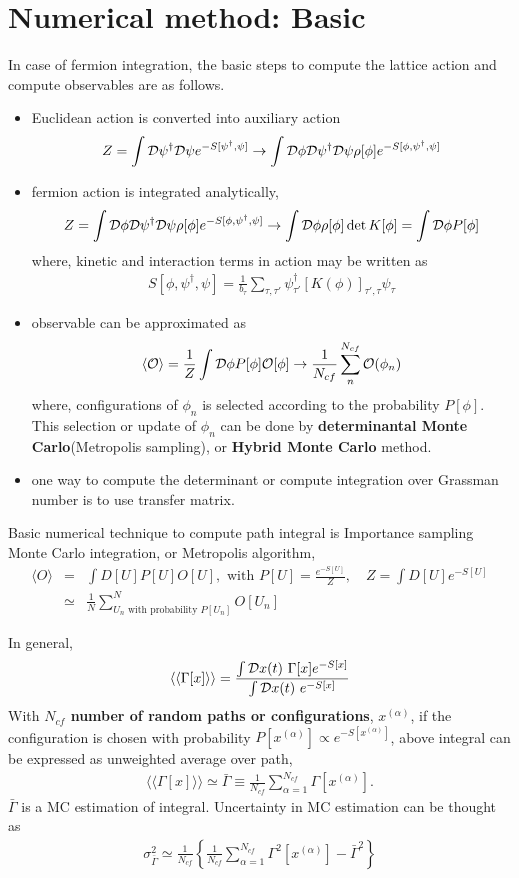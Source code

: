 \documentclass[10pt]{book}
\newcommand{\bea}{\begin{eqnarray}}
\newcommand{\eea}{\end{eqnarray}}
\newcommand{\no}{\nonumber \\}
\def\la{\langle}
\def\ra{\rangle}
\begin{document}
\chapter{Numerical method: Basic }

In case of fermion integration, the basic steps to compute the lattice action
and compute observables are as follows.
\begin{itemize}
	\item Euclidean action is converted into auxiliary action
	\bea
	Z=\int {\cal D}\psi^\dagger {\cal D}\psi e^{-S[\psi^\dagger,\psi]} 
	\to \int {\cal D}\phi {\cal D}\psi^\dagger {\cal D}\psi  \rho[\phi] e^{-S[\phi,\psi^\dagger,\psi]} 
	\eea 
	\item fermion action is integrated analytically,
	\bea 
	Z=\int {\cal D}\phi {\cal D}\psi^\dagger {\cal D}\psi \rho[\phi] e^{-S[\phi,\psi^\dagger,\psi]} 
	\to \int {\cal D}\phi \rho[\phi]\det K[\phi] =\int {\cal D}\phi P[\phi]
    \eea 
    	where, kinetic and interaction terms in action may be written as
    \bea 
    S[\phi,\psi^\dagger,\psi]=\frac{1}{b_\tau}\sum_{\tau,\tau'} \psi^\dagger_{\tau'}[K(\phi)]_{\tau',\tau}\psi_\tau 
    \eea 
    
    \item observable can be approximated as
    \bea 
    \la {\cal O}\ra =\frac{1}{Z}\int {\cal D}\phi P[\phi] {\cal O}[\phi]
    \to \frac{1}{N_{cf}}\sum_{n}^{N_{cf}} {\cal O}(\phi_n)
    \eea 
    where, configurations of $\phi_n$ is selected according to the probability $P[\phi]$.
    This selection or update of $\phi_n$ can be done by {\bf determinantal Monte Carlo}(Metropolis sampling),
    or {\bf Hybrid Monte Carlo} method.
    \item one way to compute the determinant or compute integration over Grassman number 
          is to use transfer matrix.  
\end{itemize}



Basic numerical technique to compute path integral is Importance sampling Monte 
Carlo integration, or Metropolis algorithm, 
\bea
\la O\ra&=&\int D[U] P[U] O[U],\mbox{ with } 
         P[U]=\frac{e^{-S[U]}}{Z},\quad 
        Z=\int D[U] e^{-S[U]}\no
        &\simeq& \frac{1}{N}\sum_{U_n \mbox{ with probability } P[U_n] }^N O[U_n]  
\eea

In general,
\bea 
\la\la \Gamma[x]\ra\ra=\frac{\int {\cal D}x(t)\ \Gamma[x] e^{-S[x]}}{\int {\cal D}x(t)\ e^{-S[x]}}
\eea 
With {\bf $N_{cf}$ number of random paths or configurations}, $x^{(\alpha)}$,  
if the configuration is chosen with probability $P[x^{(\alpha)}]\propto e^{-S[x^{(\alpha)}]}$,
above integral can be expressed as unweighted average over path,
\bea 
\la\la \Gamma[x]\ra\ra\simeq 
\bar{\Gamma}\equiv \frac{1}{N_{cf}}\sum_{\alpha=1}^{N_{cf}}\Gamma[x^{(\alpha)}].
\eea 
$\bar{\Gamma}$ is a MC estimation of integral. Uncertainty in MC estimation can be thought as
\bea 
\sigma^2_{\bar{\Gamma}}\simeq 
\frac{1}{N_{cf}}\left\{\frac{1}{N_{cf}}\sum_{\alpha=1}^{N_{cf}}\Gamma^2[x^{(\alpha)}]
         -\bar{\Gamma}^2     \right\}
\eea 
\end{document}
